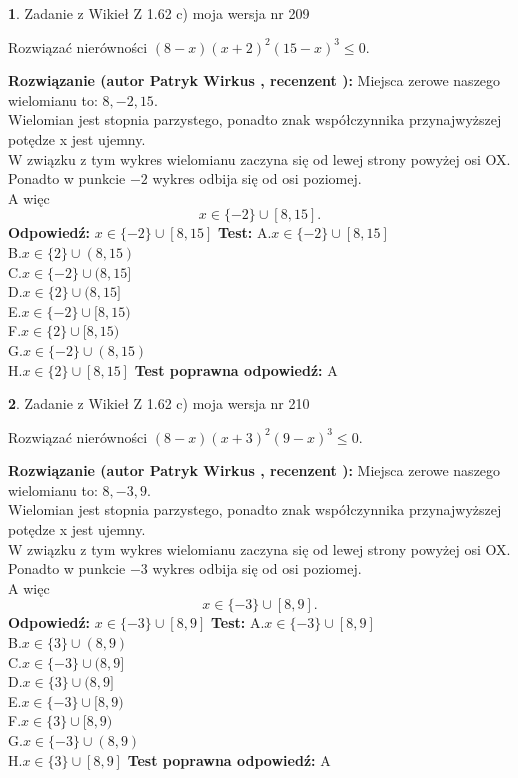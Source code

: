 \documentclass[12pt, a4paper]{article}
\theoremstyle{definition} %
\newtheorem{zad}{}
\newcommand{\zadStart}[1]{\begin{zad}#1\newline}
\newcommand{\zadStop}{\end{zad}}
\newcommand{\rozwStart}[2]{\noindent \textbf{Rozwiązanie (autor #1 , recenzent #2): }\newline}
\newcommand{\rozwStop}{\newline}
\newcommand{\odpStart}{\noindent \textbf{Odpowiedź:}\newline}
\newcommand{\odpStop}{\newline}
\newcommand{\testStart}{\noindent \textbf{Test:}\newline}
\newcommand{\testStop}{\newline}
\newcommand{\kluczStart}{\noindent \textbf{Test poprawna odpowiedź:}\newline}
\newcommand{\kluczStop}{\newline}
\begin{document}
\zadStart{Zadanie z Wikieł Z 1.62 c) moja wersja nr 209}

Rozwiązać nierówności $(8-x)(x+2)^{2}(15-x)^{3}\le0$.
\zadStop
\rozwStart{Patryk Wirkus}{}
Miejsca zerowe naszego wielomianu to: $8, -2, 15$.\\
Wielomian jest stopnia parzystego, ponadto znak współczynnika przy\linebreak najwyższej potędze x jest ujemny.\\ W związku z tym wykres wielomianu zaczyna się od lewej strony powyżej osi OX.\\
Ponadto w punkcie $-2$ wykres odbija się od osi poziomej.\\
A więc $$x \in \{-2\} \cup [8,15].$$
\rozwStop
\odpStart
$x \in \{-2\} \cup [8,15]$
\odpStop
\testStart
A.$x \in \{-2\} \cup [8,15]$\\
B.$x \in \{2\} \cup (8,15)$\\
C.$x \in \{-2\} \cup (8,15]$\\
D.$x \in \{2\} \cup (8,15]$\\
E.$x \in \{-2\} \cup [8,15)$\\
F.$x \in \{2\} \cup [8,15)$\\
G.$x \in \{-2\} \cup (8,15)$\\
H.$x \in \{2\} \cup [8,15]$
\testStop
\kluczStart
A
\kluczStop



\zadStart{Zadanie z Wikieł Z 1.62 c) moja wersja nr 210}

Rozwiązać nierówności $(8-x)(x+3)^{2}(9-x)^{3}\le0$.
\zadStop
\rozwStart{Patryk Wirkus}{}
Miejsca zerowe naszego wielomianu to: $8, -3, 9$.\\
Wielomian jest stopnia parzystego, ponadto znak współczynnika przy\linebreak najwyższej potędze x jest ujemny.\\ W związku z tym wykres wielomianu zaczyna się od lewej strony powyżej osi OX.\\
Ponadto w punkcie $-3$ wykres odbija się od osi poziomej.\\
A więc $$x \in \{-3\} \cup [8,9].$$
\rozwStop
\odpStart
$x \in \{-3\} \cup [8,9]$
\odpStop
\testStart
A.$x \in \{-3\} \cup [8,9]$\\
B.$x \in \{3\} \cup (8,9)$\\
C.$x \in \{-3\} \cup (8,9]$\\
D.$x \in \{3\} \cup (8,9]$\\
E.$x \in \{-3\} \cup [8,9)$\\
F.$x \in \{3\} \cup [8,9)$\\
G.$x \in \{-3\} \cup (8,9)$\\
H.$x \in \{3\} \cup [8,9]$
\testStop
\kluczStart
A
\kluczStop
\end{document}
